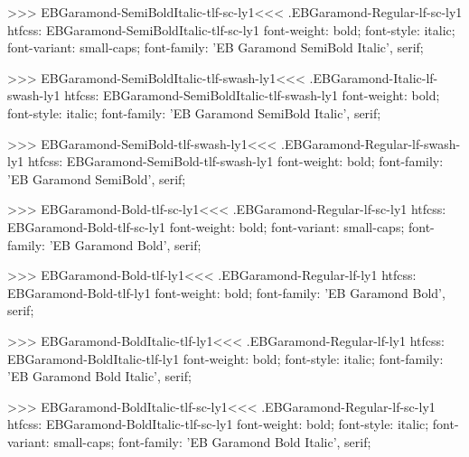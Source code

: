 {{>>>
\<EBGaramond-SemiBoldItalic-tlf-sc-ly1\><<<
.EBGaramond-Regular-lf-sc-ly1
htfcss:  EBGaramond-SemiBoldItalic-tlf-sc-ly1  font-weight: bold; font-style: italic; font-variant: small-caps; font-family: 'EB Garamond SemiBold Italic', serif;

>>>
\<EBGaramond-SemiBoldItalic-tlf-swash-ly1\><<<
.EBGaramond-Italic-lf-swash-ly1
htfcss:  EBGaramond-SemiBoldItalic-tlf-swash-ly1  font-weight: bold; font-style: italic; font-family: 'EB Garamond SemiBold Italic', serif;

>>>
\<EBGaramond-SemiBold-tlf-swash-ly1\><<<
.EBGaramond-Regular-lf-swash-ly1
htfcss:  EBGaramond-SemiBold-tlf-swash-ly1  font-weight: bold; font-family: 'EB Garamond SemiBold', serif;

>>>
\<EBGaramond-Bold-tlf-sc-ly1\><<<
.EBGaramond-Regular-lf-sc-ly1
htfcss:  EBGaramond-Bold-tlf-sc-ly1  font-weight: bold; font-variant: small-caps; font-family: 'EB Garamond Bold', serif;

>>>
\<EBGaramond-Bold-tlf-ly1\><<<
.EBGaramond-Regular-lf-ly1
htfcss:  EBGaramond-Bold-tlf-ly1  font-weight: bold; font-family: 'EB Garamond Bold', serif;

>>>
\<EBGaramond-BoldItalic-tlf-ly1\><<<
.EBGaramond-Regular-lf-ly1
htfcss:  EBGaramond-BoldItalic-tlf-ly1  font-weight: bold; font-style: italic; font-family: 'EB Garamond Bold Italic', serif;

>>>
\<EBGaramond-BoldItalic-tlf-sc-ly1\><<<
.EBGaramond-Regular-lf-sc-ly1
htfcss:  EBGaramond-BoldItalic-tlf-sc-ly1  font-weight: bold; font-style: italic; font-variant: small-caps; font-family: 'EB Garamond Bold Italic', serif;

}}
